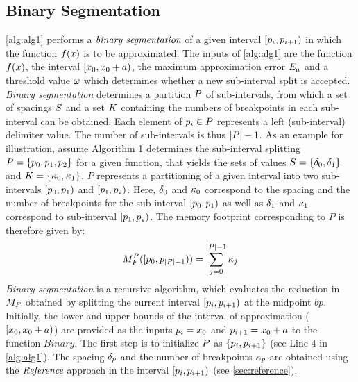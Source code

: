 \subsection{Binary Segmentation}\label{bin_seg}
\cref{alg:alg1} performs a $\textit{binary segmentation}$ of a given interval $[p_{i}, p_{i+1})$ in which the function $f(x)$ is to be approximated. 
The inputs of \cref{alg:alg1} are the function $f(x)$, the interval $[x_{0},x_{0}+a)$, the maximum approximation error $E_a$ and a threshold value $\omega$ which determines whether a new sub-interval split is accepted.
\textit{Binary segmentation} determines a partition $P$ of sub-intervals, from which a set of spacings $S$ and a set $K$ containing the numbers of breakpoints in each sub-interval can be obtained.
Each element of $p_{i} \in P$  represents a left (sub-interval) delimiter value. The number of sub-intervals is thus $|P|-1$.
As an example for illustration, assume Algorithm 1 determines the sub-interval splitting $P=\{p_{0}, p_{1}, p_{2}\}$ for a given function, that yields the sets of values $S=\{\delta_{0},\delta_{1}\}$ and $K=\{\kappa_{0},\kappa_{1}\}$.
$P$ represents a partitioning of a given interval into two sub-intervals
$[p_{0},p_{1})$ and $[p_{1},p_{2})$.
Here, $\delta_{0}$ and $\kappa_{0}$ correspond to the spacing and the number of breakpoints for the sub-interval $[p_{0},p_{1})$ as well as $\delta_{1}$ and $\kappa_{1}$ correspond to sub-interval $[p_{1},p_{2})$.
The memory footprint corresponding to $P$ is therefore given by:
\begin{equation}
M_{F}^P([p_{0},p_{|P|-1})) = \sum^{|P|-1}_{j=0} \kappa_{j}
\label{eq:memFProposed}
\end{equation}
\textit{Binary segmentation} is a recursive algorithm, which evaluates the reduction in $M_{F}$ obtained by splitting the current interval $[p_{i},p_{i+1})$ at the midpoint $bp$. 
Initially, the lower and upper bounds of the interval of approximation ($[x_{0},x_{0}+a)$) are provided as the inputs $p_{i}=x_{0}$ and $p_{i+1}=x_{0}+a$ to the function $Binary$. 
The first step is to initialize $P$ as $\{p_{i}, p_{i+1}\}$ (see Line $4$ in \cref{alg:alg1}). 
The spacing $\delta_{p}$ and the number of breakpoints $\kappa_{p}$ are obtained using the $\textit{Reference}$ approach in the interval $[p_{i}, p_{i+1})$ (see \cref{sec:reference}).\\
